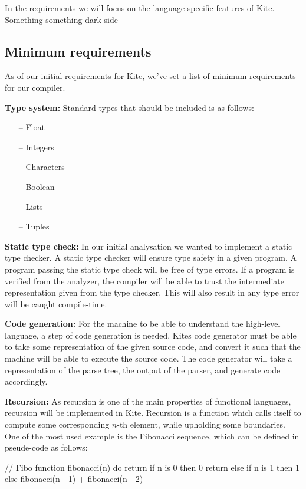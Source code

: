 In the requirements we will focus on the language specific features of
Kite. Something something dark side

\subsection{Minimum requirements}
As of our initial requirements for Kite, we've set a list of minimum
requirements for our compiler.

\textbf{Type system:} Standard types that should be included is as
follows:
\begin{itemize}
\item [--] Float
\item [--] Integers
\item [--] Characters
\item [--] Boolean
\item [--] Lists
\item [--] Tuples
\end{itemize}

\textbf{Static type check:} In our initial analysation we wanted to
implement a static type checker. A static type checker will ensure
type safety in a given program. A program passing the static type
check will be free of type errors. If a program is verified from the
analyzer, the compiler will be able to trust the intermediate
representation given from the type checker. This will also result in
any type error will be caught compile-time.

\textbf{Code generation:} For the machine to be able to understand the
high-level language, a step of code generation is needed. Kites code
generator must be able to take some representation of the given source
code, and convert it such that the machine will be able to execute the
source code. The code generator will take a representation of the
parse tree, the output of the parser, and generate code
accordingly.

\textbf{Recursion:} As recursion is one of the main properties of
functional languages, recursion will be implemented in Kite. Recursion
is a function which calls itself to compute some corresponding $n$-th
element, while upholding some boundaries. One of the most used example
is the Fibonacci sequence, which can be defined in pseude-code as
follows:
\begin{pseudo}
// Fibo
function fibonacci(n) do
  return if n is 0
    then 0
  return else if n is 1
    then 1
  else fibonacci(n - 1) + fibonacci(n - 2)
\end{pseudo}

